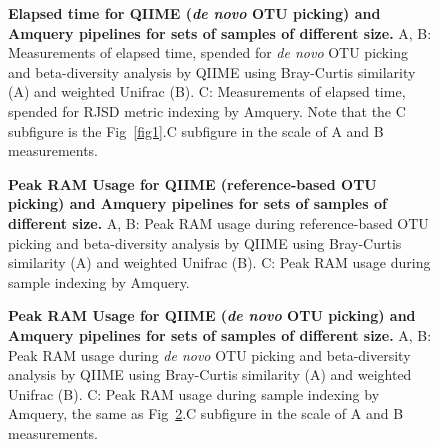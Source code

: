 \documentclass[10pt,letterpaper]{article}
\begin{document}
\begin{figure}[!h]
\caption{{\bf Elapsed time for QIIME (\textit{de novo} OTU picking) and Amquery pipelines for sets of samples of different size.}
A, B: Measurements of elapsed time, spended for \textit{de novo} OTU picking and beta-diversity analysis by QIIME using Bray-Curtis similarity (A) and weighted Unifrac (B). 
C: Measurements of elapsed time, spended for RJSD metric indexing by Amquery. Note that the C subfigure is the Fig~\ref{fig1}.C subfigure in the scale of A and B measurements. }
\label{fig2}
\end{figure}

\begin{figure}[!h]
\caption{{\bf Peak RAM Usage for QIIME (reference-based OTU picking) and Amquery pipelines for sets of samples of different size.}
A, B: Peak RAM usage during reference-based OTU picking and beta-diversity analysis by QIIME using Bray-Curtis similarity (A) and weighted Unifrac (B). 
C: Peak RAM usage during sample indexing by Amquery.}
\label{fig3}
\end{figure}

\begin{figure}[!h]
\caption{{\bf Peak RAM Usage for QIIME (\textit{de novo} OTU picking) and Amquery pipelines for sets of samples of different size.}
A, B: Peak RAM usage during \textit{de novo} OTU picking and beta-diversity analysis by QIIME using Bray-Curtis similarity (A) and weighted Unifrac (B). 
C: Peak RAM usage during sample indexing by Amquery, the same as Fig~\ref{fig3}.C subfigure in the scale of A and B measurements.}
\label{fig4}
\end{figure}
\end{document}
